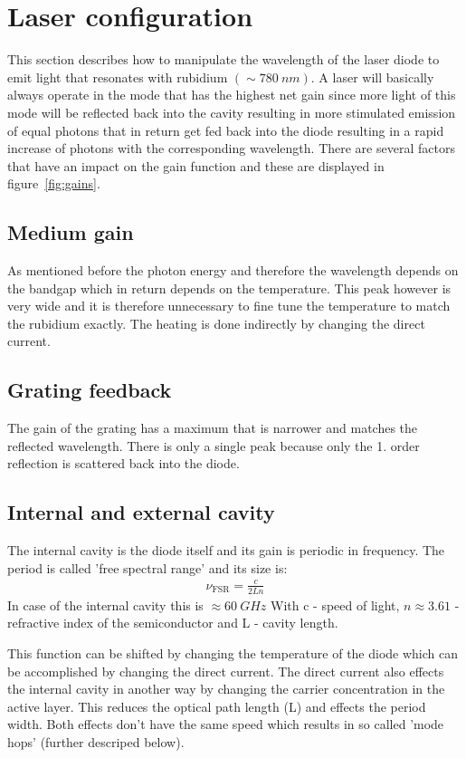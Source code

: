 \section{Laser configuration}
This section describes how to manipulate the wavelength of the laser diode to emit light that resonates with rubidium $(\sim \SI{780}{nm})$. A laser will basically always operate in the mode that has the highest net gain since more light of this mode will be reflected back into the cavity resulting in more stimulated emission of equal photons that in return get fed back into the diode resulting in a rapid increase of photons with the corresponding wavelength. There are several factors that have an impact on the gain function and these are displayed in \mbox{figure \ref{fig:gains}}.

\subsection{Medium gain}
As mentioned before the photon energy and therefore the wavelength depends on the bandgap which in return depends on the temperature. This peak however is very wide and it is therefore unnecessary to fine tune the temperature to match the rubidium exactly. The heating is done indirectly by changing the direct current.

\subsection{Grating feedback}
The gain of the grating has a maximum that is narrower and matches the reflected wavelength. There is only a single peak because only the 1. order reflection is scattered back into the diode.

\subsection{Internal and external cavity}
The internal cavity is the diode itself and its gain is periodic in frequency. The period is called 'free spectral range' and its size is:
\begin{align}
	\nu_\text{FSR} = \frac{c}{2Ln}
\end{align}
In case of the internal cavity this is $\approx \SI{60}{GHz}$
With c - speed of light, $n\approx3.61$ - refractive index of the semiconductor and L - cavity length.

This function can be shifted by changing the temperature of the diode which can be accomplished by changing the direct current.
The direct current also effects the internal cavity in another way by changing the carrier concentration in the active layer. This reduces the optical path length (L) and effects the period width. Both effects don't have the same speed which results in so called 'mode hops' (further descriped below).

